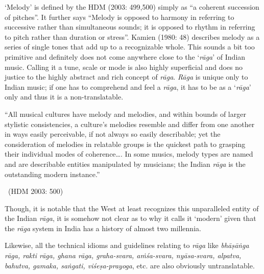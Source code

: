 ‘Melody’ is defined by the HDM (2003: 499,500) simply as “a coherent succession of pitches”. It further says “Melody is opposed to harmony in referring to successive rather than simultaneous sounds; it is opposed to rhythm in referring to pitch rather than duration or stress”. Kamien (1980: 48) describes melody as a series of single tones that add up to a recognizable whole. This sounds a bit too primitive and definitely does not come anywhere close to the ‘\textit{rāga}’ of Indian music. Calling it a tune, scale or mode is also highly superficial and does no justice to the highly abstract and rich concept of \textit{rāga}. \textit{Rāga} is unique only to Indian music; if one has to comprehend and feel a \textit{rāga}, it has to be as a ‘\textit{rāga}’ only and thus it is a non-translatable.

\begin{myquote}
“All musical cultures have melody and melodies, and within bounds of larger stylistic consistencies, a culture’s melodies resemble and differ from one another in ways easily perceivable, if not always so easily describable; yet the consideration of melodies in relatable groups is the quickest path to grasping their individual modes of coherence…. In some musics, melody types are named and are describable entities manipulated by musicians; the Indian \textit{rāga} is the outstanding modern instance.” 

~\hfill (HDM 2003: 500)
\end{myquote}

Though, it is notable that the West at least recognizes this unparalleled entity of the Indian \textit{rāga}, it is somehow not clear as to why it calls it ‘modern’ given that the \textit{rāga} system in India has a history of almost two millennia.

Likewise, all the technical idioms and guidelines relating to \textit{rāga} like \textit{bhāṣāṅga rāga, rakti rāga, ghana rāga, graha-svara, aṁśa-svara, nyāsa-svara, alpatva, bahutva, gamaka, saṅgati, viśeṣa-prayoga}, etc. are also obviously untranslatable.


